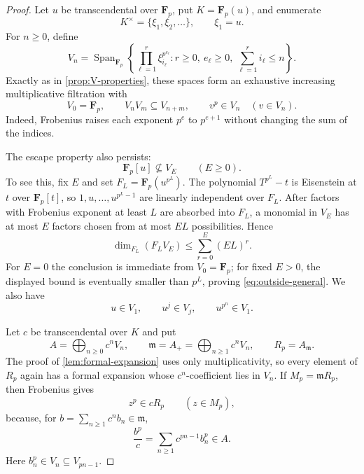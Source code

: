 \documentclass[11pt,reqno]{amsart}
\numberwithin{equation}{section}
\theoremstyle{plain}
\theoremstyle{definition}
\theoremstyle{remark}
\newcommand{\F}{\mathbf F}
\newcommand{\Span}{\operatorname{Span}}
\newcommand{\fm}{\mathfrak m}
\begin{document}
\begin{proof}
Let $u$ be transcendental over $\F_p$, put $K=\F_p(u)$, and enumerate
\[
  K^\times=\{\xi_1,\xi_2,\ldots\},\qquad \xi_1=u.
\]
For $n\geq0$, define
\begin{equation}\label{eq:V-general}
 V_n=\Span_{\F_p}\left\{
  \prod_{\ell=1}^r\xi_{i_\ell}^{p^{e_\ell}}:
  r\geq0,\ e_\ell\geq0,\ \sum_{\ell=1}^ri_\ell\leq n
 \right\}.
\end{equation}
Exactly as in \cref{prop:V-properties}, these spaces form an exhaustive
increasing multiplicative filtration with
\begin{equation}\label{eq:properties-general}
 V_0=\F_p,\qquad V_nV_m\subseteq V_{n+m},\qquad
 v^p\in V_n\quad(v\in V_n).
\end{equation}
Indeed, Frobenius raises each exponent $p^e$ to $p^{e+1}$ without changing
the sum of the indices.

The escape property also persists:
\begin{equation}\label{eq:outside-general}
  \F_p[u]\nsubseteq V_E\qquad(E\geq0).
\end{equation}
To see this, fix $E$ and set $F_L=\F_p(u^{p^L})$.  The polynomial
$T^{p^L}-t$ is Eisenstein at $t$ over $\F_p[t]$, so
$1,u,\ldots,u^{p^L-1}$ are linearly independent over $F_L$.  After factors
with Frobenius exponent at least $L$ are absorbed into $F_L$, a monomial in
$V_E$ has at most $E$ factors chosen from at most $EL$ possibilities.  Hence
\[
  \dim_{F_L}(F_LV_E)\leq\sum_{r=0}^E(EL)^r.
\]
For $E=0$ the conclusion is immediate from $V_0=\F_p$; for fixed $E>0$,
the displayed bound is eventually smaller than $p^L$, proving
\eqref{eq:outside-general}.  We also have
\[
  u\in V_1,\qquad u^j\in V_j,\qquad u^{p^n}\in V_1.
\]

Let $c$ be transcendental over $K$ and put
\begin{equation}\label{eq:R-general}
 A=\bigoplus_{n\geq0}c^nV_n,\qquad
 \fm=A_+=\bigoplus_{n\geq1}c^nV_n,\qquad
 R_p=A_{\fm}.
\end{equation}
The proof of \cref{lem:formal-expansion} uses only multiplicativity, so every
element of $R_p$ again has a formal expansion whose $c^n$-coefficient lies
in $V_n$.  If $M_p=\fm R_p$, then Frobenius gives
\begin{equation}\label{eq:p-control-general}
  z^p\in cR_p\qquad(z\in M_p),
\end{equation}
because, for $b=\sum_{n\geq1}c^nb_n\in\fm$,
\[
  \frac{b^p}{c}=\sum_{n\geq1}c^{pn-1}b_n^p\in A.
\]
Here $b_n^p\in V_n\subseteq V_{pn-1}$.


\end{proof}
\end{document}
